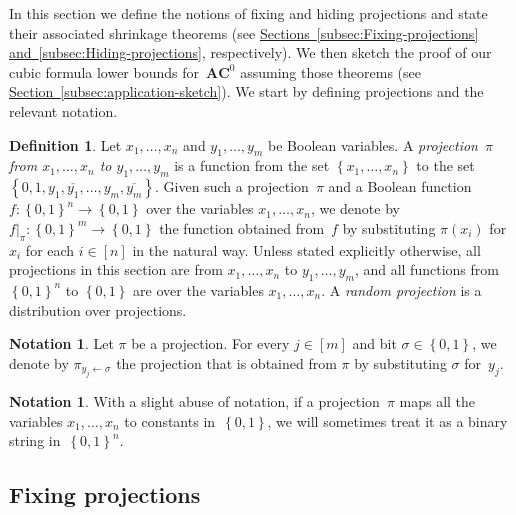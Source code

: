 \documentclass[11pt]{article}
\numberwithin{equation}{section}
\theoremstyle{definition}
\newtheorem{definition}[theorem]{Definition}
\theoremstyle{plain}
\newcommand{\expref}[2]{\hyperref[#2]{#1~\ref{#2}}}
\theoremstyle{definition}\newtheorem{notation}[theorem]{Notation}\theoremstyle{plain}
\newcommand{\B}{\left\{ 0,1 \right \}}
\newcommand{\ACz}{\boldsymbol{AC}^{0}}
\theoremstyle{definition}
\theoremstyle{plain}
\begin{document}
In this section we define the notions of fixing and hiding projections
and state their associated shrinkage theorems
(see \expref{Sections}{subsec:Fixing-projections}
\expref{and}{subsec:Hiding-projections}, %
respectively). We then sketch the proof of our cubic formula lower
bounds for~$\ACz$ assuming those theorems (see \expref{Section}{subsec:application-sketch}).
We start by defining projections and the relevant notation.
\begin{definition}
Let $x_{1},\ldots,x_{n}$ and $y_{1},\ldots,y_{m}$ be Boolean variables.
A \emph{projection}~$\pi$ \emph{from $x_{1},\ldots,x_{n}$ to $y_{1},\ldots,y_{m}$}
is a function from the set $\left\{ x_{1},\ldots,x_{n}\right\} $
to the set $\left\{ 0,1,y_{1},\overline{y_{1}},\ldots,y_{m},\overline{y_{m}}\right\} $.
Given such a projection~$\pi$ and a Boolean function~$f\colon\B^{n}\to\B$
over the variables $x_{1},\ldots,x_{n}$, we denote by $f|_{\pi}\colon\B^{m}\to\B$
the function obtained from~$f$ by substituting $\pi(x_{i})$ for
$x_{i}$ for each $i\in\left[n\right]$ in the natural way. Unless
stated explicitly otherwise, all projections in this section are from
\emph{$x_{1},\ldots,x_{n}$} to $y_{1},\ldots,y_{m}$, and all functions
from~$\B^{n}$ to $\B$ are over the variables $x_{1},\ldots,x_{n}$.
A \emph{random projection} is a distribution over projections. 
\end{definition}

\begin{notation}
Let $\pi$ be a projection. For every $j\in[m]$ and bit $\sigma\in\B$,
we denote by $\pi_{y_{j}\gets\sigma}$ the projection that is obtained
from $\pi$ by substituting $\sigma$ for~$y_{j}$. 
\end{notation}

\begin{notation}
With a slight abuse of notation, if a projection~$\pi$ maps all
the variables $x_{1},\ldots,x_{n}$ to constants in~$\B$, we will
sometimes treat it as a binary string in~$\B^{n}$. 
\end{notation}


\subsection{\label{subsec:Fixing-projections}Fixing projections}
\end{document}
